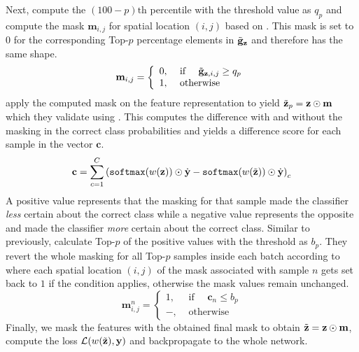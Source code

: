 Next, \citet{huang2020selfchallenging} compute the $(100-p)\mathrm{th}$ percentile with the threshold value as $q_p$ and compute the mask $\mathbf{m}_{i,j}$ for spatial location $(i,j)$ based on . This mask is set to $0$ for the corresponding Top-$p$ percentage elements in $\Tilde{\mathbf{g}}_\mathbf{z}$ and therefore has the same shape. 
\begin{equation}
\mathbf{m}_{i,j}=\left\{\begin{array}{ll}
0, & \text { if } \quad \Tilde{\mathbf{g}}_{\mathbf{z}, i, j} \geq q_{p} \\
1, & \text { otherwise }
\end{array}\right.
\label{eq:Masking}
\end{equation}
\citet{huang2020selfchallenging} apply the computed mask on the feature representation to yield $\Tilde{\mathbf{z}}_p = \mathbf{z} \odot \mathbf{m}$ which they validate using . This computes the difference with and without the masking in the correct class probabilities and yields a difference score for each sample in the vector $\mathbf{c}$.  
\begin{equation}
   \mathbf{c} = \sum_{c=1}^C  \left(\mathtt{softmax}(w(\mathbf{z})) \odot \dot{\mathbf{y}} - \mathtt{softmax}(w(\Tilde{\mathbf{z}})) \odot \dot{\mathbf{y}} \right)_c
   \label{eq:changeval}
\end{equation}
A positive value represents that the masking for that sample made the classifier \emph{less} certain about the correct class while a negative value represents the opposite and made the classifier \emph{more} certain about the correct class. Similar to previously, \citet{huang2020selfchallenging} calculate Top-$p$ of the positive values with the threshold as $b_p$. They revert the whole masking for all Top-$p$ samples inside each batch according to  where each spatial location $(i,j)$ of the mask associated with sample $n$ gets set back to $1$ if the condition applies, otherwise the mask values remain unchanged.
\begin{equation}
    \mathbf{m}^n_{i,j}=\left\{\begin{array}{ll}
1, & \text { if } \quad \mathbf{c}_n \leq b_{p} \\
-, & \text { otherwise }
\end{array}\right.
\label{eq:Masking-Reversion-RSC}
\end{equation}
Finally, we mask the features with the obtained final mask to obtain $\Tilde{\mathbf{z}} = \mathbf{z} \odot \mathbf{m}$, compute the loss $\mathcal{L}(w(\Tilde{\mathbf{z}}), \mathbf{y})$ and backpropagate to the whole network.

